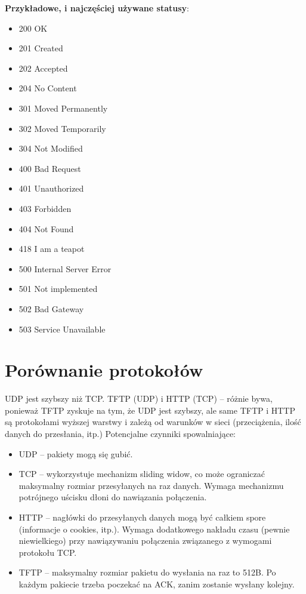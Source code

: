 \textbf{Przykładowe, i najczęściej używane statusy}:
\begin{multicols}{2}
	\begin{itemize}
		\item 200 OK
		\item 201 Created
		\item 202 Accepted
		\item 204 No Content
		\item 301 Moved Permanently
		\item 302 Moved Temporarily
		\item 304 Not Modified
		\item 400 Bad Request
		\item 401 Unauthorized
		\item 403 Forbidden
		\item 404 Not Found
		\item 418 I am a teapot
		\item 500 Internal Server Error
		\item 501 Not implemented
		\item 502 Bad Gateway
		\item 503 Service Unavailable
	\end{itemize}
\end{multicols}

\section{Porównanie protokołów}
UDP jest szybszy niż TCP. TFTP (UDP) i HTTP (TCP) -- różnie bywa, ponieważ TFTP zyskuje na tym, że UDP jest szybszy, ale same TFTP i HTTP są protokołami wyższej warstwy i zależą od warunków w sieci (przeciążenia, ilość danych do przesłania, itp.) Potencjalne czynniki spowalniające:
\begin{itemize}
	\item UDP -- pakiety mogą się gubić.
	\item TCP -- wykorzystuje mechanizm sliding widow, co może ograniczać maksymalny rozmiar przesyłanych na raz danych. Wymaga mechanizmu potrójnego uścisku dłoni do nawiązania połączenia.
	\item HTTP -- nagłówki do przesyłanych danych mogą być całkiem spore (informacje o cookies, itp.). Wymaga dodatkowego nakładu czasu (pewnie niewielkiego) przy nawiązywaniu połączenia związanego z wymogami protokołu TCP.
	\item TFTP -- maksymalny rozmiar pakietu do wysłania na raz to 512B. Po każdym pakiecie trzeba poczekać na ACK, zanim zostanie wysłany kolejny.
\end{itemize}

